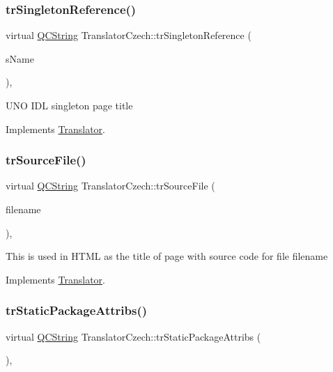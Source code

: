 \subsubsection{\texorpdfstring{trSingletonReference()}{trSingletonReference()}}
{\footnotesize\ttfamily virtual \mbox{\hyperlink{class_q_c_string}{Q\+C\+String}} Translator\+Czech\+::tr\+Singleton\+Reference (\begin{DoxyParamCaption}\item[{const char $\ast$}]{s\+Name }\end{DoxyParamCaption})\hspace{0.3cm}{\ttfamily [inline]}, {\ttfamily [virtual]}}

U\+NO I\+DL singleton page title 

Implements \mbox{\hyperlink{class_translator}{Translator}}.

\mbox{\label{class_translator_czech_a06a0c380cbb43d799fa553f4838b45ee}} 
\subsubsection{\texorpdfstring{trSourceFile()}{trSourceFile()}}
{\footnotesize\ttfamily virtual \mbox{\hyperlink{class_q_c_string}{Q\+C\+String}} Translator\+Czech\+::tr\+Source\+File (\begin{DoxyParamCaption}\item[{\mbox{\hyperlink{class_q_c_string}{Q\+C\+String}} \&}]{filename }\end{DoxyParamCaption})\hspace{0.3cm}{\ttfamily [inline]}, {\ttfamily [virtual]}}

This is used in H\+T\+ML as the title of page with source code for file filename 

Implements \mbox{\hyperlink{class_translator}{Translator}}.

\mbox{\label{class_translator_czech_a007495c5ee1b5ec8a7a84c76561a5ff3}} 
\subsubsection{\texorpdfstring{trStaticPackageAttribs()}{trStaticPackageAttribs()}}
{\footnotesize\ttfamily virtual \mbox{\hyperlink{class_q_c_string}{Q\+C\+String}} Translator\+Czech\+::tr\+Static\+Package\+Attribs (\begin{DoxyParamCaption}{ }\end{DoxyParamCaption})\hspace{0.3cm}{\ttfamily [inline]}, {\ttfamily [virtual]}}


